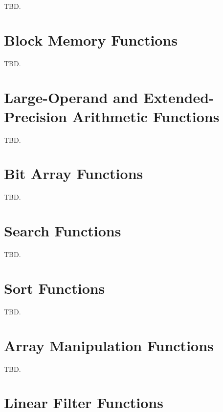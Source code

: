 TBD.

\section{Block Memory Functions}
\label{cfrf2:sbmf2}

TBD.

\section{Large-Operand and Extended-Precision Arithmetic Functions}
\label{cfrf2:slaf2}

TBD.

\section{Bit Array Functions}
\label{cfrf2:sbaf2}

TBD.

\section{Search Functions}
\label{cfrf2:ssea2}

TBD.

\section{Sort Functions}
\label{cfrf2:ssol2}

TBD.

\section{Array Manipulation Functions}
\label{cfrf2:sami2}

TBD.

\section{Linear Filter Functions}
\label{cfrf2:slfi2}

